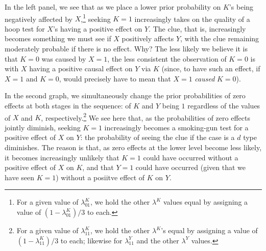 \documentclass[
  12pt,
]{book}
\begin{document}
In the left panel, we see that as we place a lower prior probability on \(K\)'s being negatively affected by \(X\),\footnote{For a given value of \(\lambda^K_{01}\), we hold the other \(\lambda^K\) values equal by assigning a value of \((1-\lambda^K_{01})/3\) to each.} seeking \(K=1\) increasingly takes on the quality of a hoop test for \(X\)'s having a positive effect on \(Y\). The clue, that is, increasingly becomes something we must see if \(X\) positively affects \(Y\), with the clue remaining moderately probable if there is no effect. Why? The less likely we believe it is that \(K=0\) was caused by \(X=1\), the less consistent the observation of \(K=0\) is with \(X\) having a positive causal effect on \(Y\) via \(K\) (since, to have such an effect, if \(X=1\) and \(K=0\), would precisely have to mean that \(X=1\) \emph{caused} \(K=0\)).

In the second graph, we simultaneously change the prior probabilities of zero effects at both stages in the sequence: of \(K\) and \(Y\) being \(1\) regardless of the values of \(X\) and \(K\), respectively.\footnote{For a given value of \(\lambda^K_{11}\), we hold the other \(\lambda^K\)'s equal by assigning a value of \((1-\lambda^K_{11})/3\) to each; likewise for \(\lambda^Y_{11}\) and the other \(\lambda^Y\) values.} We see here that, as the probabilities of zero effects jointly diminish, seeking \(K=1\) increasingly becomes a smoking-gun test for a positive effect of \(X\) on \(Y\): the probability of seeing the clue if the case is a \(d\) type diminishes. The reason is that, as zero effects at the lower level become less likely, it becomes increasingly unlikely that \(K=1\) could have occurred without a positive effect of \(X\) on \(K\), and that \(Y=1\) could have occurred (given that we have seen \(K=1\)) without a posiitve effect of \(K\) on \(Y\).
\end{document}
